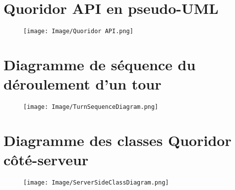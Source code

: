 \documentclass[french, utf8]{article}
\begin{document}
\section{Quoridor API en pseudo-UML}
\begin{figure}[ht]
\centering
    \texttt{[image: Image/Quoridor API.png]}
\end{figure}

\newpage
\section{Diagramme de séquence du déroulement d'un tour}
\begin{figure}[ht]
\centering
    \texttt{[image: Image/TurnSequenceDiagram.png]}
\end{figure}

\newpage
\section{Diagramme des classes Quoridor côté-serveur}
\begin{figure}[ht]
\centering
    \texttt{[image: Image/ServerSideClassDiagram.png]}
\end{figure}
\end{document}

